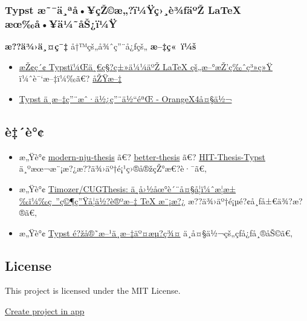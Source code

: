 \subsubsection{Typst æ˜¯ä¸ªå•¥çŽ©æ„?ï¼Ÿç›¸è¾ƒäºŽ LaTeX
æœ‰å•¥ä¼˜åŠ¿ï¼Ÿ}\label{typst-uxe6uxe4uxaauxe5uxe7ux17euxe6uxefuxbcuxffuxe7uxe8uxbeux192uxe4uxbaux17e-latex-uxe6ux153uxe5uxe4uxbcuxe5ux161uxefuxbcuxff}

\textbf{æ??ä¾›ä¸¤ç¯‡} å†™çš„å¾ˆç''¨å¿ƒçš„ \textbf{æ--‡ç«~ï¼š}

\begin{itemize}
\tightlist
\item
  \href{https://mp.weixin.qq.com/s/58IYHA3pROuh4iDHB4o1Vw}{æŽ¢ç´¢
  Typstï¼Œä¸€ç§?ç±»ä¼¼äºŽ LaTeX çš„æ--°æŽ'ç‰ˆç³»ç»Ÿ} ï¼ˆè¯`æ--‡ï¼‰ã€?
  \href{https://blog.jreyesr.com/posts/typst/}{åŽŸæ--‡}
\item
  \href{https://zhuanlan.zhihu.com/p/669097092}{Typst
  ä¸­æ--‡ç''¨æˆ·ä½¿ç''¨ä½``éªŒ - OrangeX4å¤§ä½¬}
\end{itemize}

\subsection{è‡´è°¢}\label{uxe8uxe8}

\begin{itemize}
\tightlist
\item
  æ„Ÿè°¢
  \href{https://github.com/nju-lug/modern-nju-thesis}{modern-nju-thesis}
  ã€? \href{https://github.com/sysu/better-thesis}{better-thesis} ã€?
  \href{https://github.com/hitszosa/universal-hit-thesis}{HIT-Thesis-Typst}
  ä¸ºæœ¬æ¨¡æ?¿æ??ä¾›äº†é¡¹ç›®å®žçŽ°æ€?è·¯ã€‚
\item
  æ„Ÿè°¢ \href{https://github.com/Timozer/CUGThesis}{Timozer/CUGThesis:
  ä¸­å›½åœ°è´¨å¤§å­¦ï¼ˆæ­¦æ±‰ï¼‰ç~''ç©¶ç''Ÿå­¦ä½?è®ºæ--‡ TeX æ¨¡æ?¿}
  æ??ä¾›äº†é¡µé?¢å¸ƒå±€ä¾?æ?®ã€‚
\item
  æ„Ÿè°¢ \href{https://jq.qq.com/?_wv=1027&k=m58va1kd}{Typst
  é?žå®˜æ--¹ä¸­æ--‡äº¤æµ?ç¾¤} ä¸­å¤§ä½¬çš„çƒ­å¿ƒå¸®åŠ©ã€‚
\end{itemize}

\subsection{License}\label{license}

This project is licensed under the MIT License.

\href{/app?template=modern-cug-thesis&version=0.1.0}{Create project in
app}

